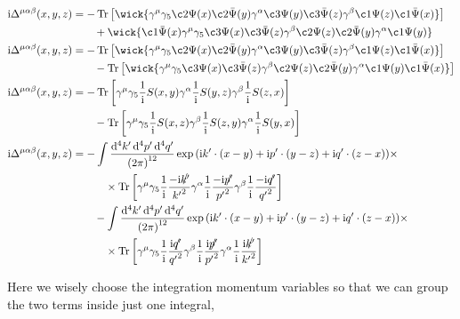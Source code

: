 \begin{align}
    \im\Delta^{\mu\alpha\beta}\qty(x,y,z)&=-\Tr\qty[\wick{\gamma^\mu\gamma_5\c2{\Psi}\qty(x)
        \c2{\bar{\Psi}}\qty(y)\gamma^\alpha\c3{\Psi}\qty(y)
        \c3{\bar{\Psi}}\qty(z)\gamma^\beta\c1{\Psi}\qty(z)\c1{\bar{\Psi}}\qty(x)}]\nonumber\\
        &\quad\quad+\wick{\c1{\bar{\Psi}}\qty(x)\gamma^\mu\gamma_5\c3{\Psi}\qty(x)
        \c3{\bar{\Psi}}\qty(z)\gamma^\beta\c2{\Psi}\qty(z)
        \c2{\bar{\Psi}}\qty(y)\gamma^\alpha\c1{\Psi}\qty(y)}\nonumber\\
    \im\Delta^{\mu\alpha\beta}\qty(x,y,z)&=-\Tr\qty[\wick{\gamma^\mu\gamma_5\c2{\Psi}\qty(x)
        \c2{\bar{\Psi}}\qty(y)\gamma^\alpha\c3{\Psi}\qty(y)
        \c3{\bar{\Psi}}\qty(z)\gamma^\beta\c1{\Psi}\qty(z)\c1{\bar{\Psi}}\qty(x)}]\nonumber\\
        &\quad\quad-\Tr\qty[\wick{\gamma^\mu\gamma_5\c3{\Psi}\qty(x)
        \c3{\bar{\Psi}}\qty(z)\gamma^\beta\c2{\Psi}\qty(z)
        \c2{\bar{\Psi}}\qty(y)\gamma^\alpha\c1{\Psi}\qty(y)\c1{\bar{\Psi}}\qty(x)}]\nonumber\\
    \im\Delta^{\mu\alpha\beta}\qty(x,y,z)&=-\Tr\qty[\gamma^\mu\gamma_5\frac1\im S\qty(x,y)\gamma^\alpha\frac1\im S\qty(y,z)\gamma^\beta\frac1\im S\qty(z,x)]\nonumber\\
        &\quad\quad-\Tr\qty[\gamma^\mu\gamma_5\frac1\im S\qty(x,z)\gamma^\beta\frac1\im S\qty(z,y)\gamma^\alpha\frac1\im S\qty(y,x)]\nonumber\\
    \im\Delta^{\mu\alpha\beta}\qty(x,y,z)&=-\int\frac{\dd[4]{k'}\dd[4]{p'}\dd[4]{q'}}{\qty(2\pi)^{12}}
        \exp\qty(\im {k'}\cdot\qty(x-y)+\im {p'}\cdot\qty(y-z)+\im {q'}\cdot\qty(z-x))\times\nonumber\\
        &\quad\quad\quad\times\Tr\qty[\gamma^\mu\gamma_5\frac1\im \frac{-\im\slashed {k'}}{{k'}^2}\gamma^\alpha\frac1\im \frac{-\im\slashed {p'}}{{p'}^2}\gamma^\beta\frac1\im \frac{-\im\slashed {q'}}{{q'}^2}]\nonumber\\
        &\quad\quad-\int\frac{\dd[4]{{k'}}\dd[4]{{p'}}\dd[4]{{q'}}}{\qty(2\pi)^{12}}
        \exp\qty(\im {k'}\cdot\qty(x-y)+\im {p'}\cdot\qty(y-z)+\im {q'}\cdot\qty(z-x))\times\nonumber\\
        &\quad\quad\quad\times\Tr\qty[\gamma^\mu\gamma_5\frac1\im \frac{\im\slashed {q'}}{{q'}^2}\gamma^\beta\frac1\im\frac{\im\slashed {p'}}{{p'}^2}\gamma^\alpha\frac1\im \frac{\im\slashed {k'}}{{k'}^2}]\nonumber
\end{align}

Here we wisely choose the integration momentum variables so that we can group the two terms inside just one 
integral,

